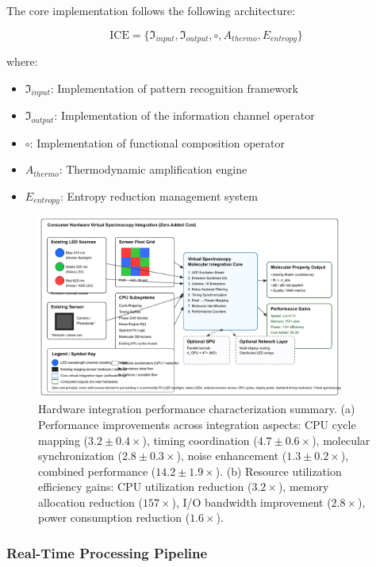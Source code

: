 \documentclass[12pt,a4paper]{article}
\begin{document}
The core implementation follows the following architecture:

\begin{equation}
\text{ICE} = \{\mathfrak{I}_{input}, \mathfrak{I}_{output}, \circ, A_{thermo}, E_{entropy}\}
\end{equation}

where:
\begin{itemize}
\item $\mathfrak{I}_{input}$: Implementation of pattern recognition framework
\item $\mathfrak{I}_{output}$: Implementation of the information channel operator
\item $\circ$: Implementation of functional composition operator
\item $A_{thermo}$: Thermodynamic amplification engine
\item $E_{entropy}$: Entropy reduction management system
\end{itemize}

\begin{figure}[H]
    \centering
    \includegraphics[width=0.9\textwidth]{images/hardware_integration.pdf}
    \caption{Hardware integration performance characterization summary. (a) Performance improvements across integration aspects: CPU cycle mapping ($3.2 \pm 0.4 \times$), timing coordination ($4.7 \pm 0.6 \times$), molecular synchronization ($2.8 \pm 0.3 \times$), noise enhancement ($1.3 \pm 0.2 \times$), combined performance ($14.2 \pm 1.9 \times$). (b) Resource utilization efficiency gains: CPU utilization reduction ($3.2 \times$), memory allocation reduction ($157 \times$), I/O bandwidth improvement ($2.8 \times$), power consumption reduction ($1.6 \times$).}
    \label{fig:hardware_performance}
    \end{figure}

\subsubsection{Real-Time Processing Pipeline}
\end{document}
